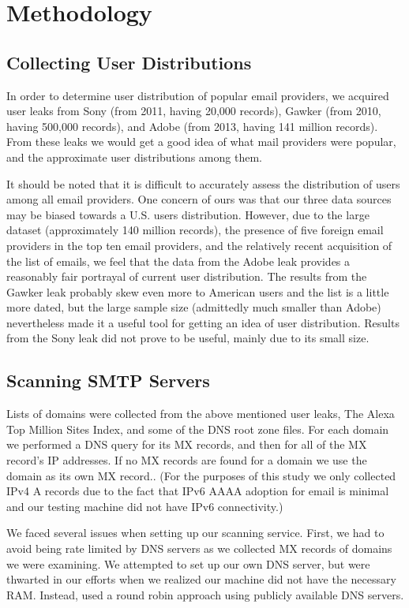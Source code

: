 \section{Methodology}
\subsection{Collecting User Distributions}
In order to determine user distribution of popular email providers, we acquired 
user leaks from Sony (from 2011, having 20,000 records)\cite{sony}, Gawker (from 2010, 
having 500,000 records)\cite{gawker}, and Adobe (from 2013, having 141 million 
records)\cite{adobe}. From these leaks we would get a good idea of what mail 
providers were popular, and the approximate user distributions among them. 

It should be noted that it is difficult to accurately assess the distribution of 
users among all email providers.  One concern of ours was that our three data 
sources may be biased towards a U.S. users distribution.  However, due to the 
large dataset (approximately 140 million records), the presence of five foreign 
email providers in the top ten email providers, and the relatively recent 
acquisition of the list of emails, we feel that the data from the Adobe leak 
provides a reasonably fair portrayal of current user distribution.  The results 
from the Gawker leak probably skew even more to American users and the list is a 
little more dated, but the large sample size (admittedly much smaller than 
Adobe) nevertheless made it a useful tool for getting an idea of user 
distribution.  Results from the Sony leak did not prove to be useful, mainly due 
to its small size. 

\subsection{Scanning SMTP Servers}
Lists of domains were collected from the above mentioned user leaks, The Alexa 
Top Million Sites Index\cite{alexa}, and some of the DNS root zone files. For each domain 
we performed a DNS query for its MX records, and then for all of the MX record’s 
IP addresses. If no MX records are found for a domain we use the domain as its 
own MX record.. (For the purposes of this study we only collected IPv4 A records 
due to the fact that IPv6 AAAA adoption for email is minimal and our testing 
machine did not have IPv6 connectivity.)

We faced several issues when setting up our scanning service.  First, we had to 
avoid being rate limited by DNS servers as we collected MX records of domains we 
were examining.  We attempted to set up our own DNS server, but were thwarted in 
our efforts when we realized our machine did not have the necessary RAM.  
Instead, used a round robin approach using publicly available DNS servers.

